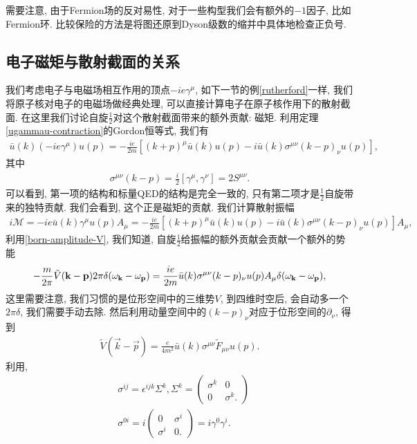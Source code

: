 需要注意, 由于Fermion场的反对易性, 对于一些构型我们会有额外的$-1$因子, 比如Fermion环. 比较保险的方法是将图还原到Dyson级数的缩并中具体地检查正负号.

\subsection{电子磁矩与散射截面的关系}
我们考虑电子与电磁场相互作用的顶点$-ie\gamma^\mu$, 如下一节的例\ref{rutherford}一样, 我们将原子核对电子的电磁场做经典处理, 可以直接计算电子在原子核作用下的散射截面. 在这里我们讨论自旋$\frac12$对这个散射截面带来的额外贡献: 磁矩. 利用定理\ref{ugammau-contraction}的Gordon恒等式, 我们有
\begin{align}
    \bar u(k)(-ie\gamma^\mu)u(p)=-\frac{ie}{2m}\left[(k+p)^\mu\bar u(k)u(p)-i\bar u(k)\sigma^{\mu\nu}(k-p)_\nu u(p)\right],
\end{align}
其中
\begin{align}
    \sigma^{\mu\nu}(k-p)=\frac i2[\gamma^\mu, \gamma^\nu]=2S^{\mu\nu}.
\end{align}
可以看到, 第一项的结构和标量QED的结构是完全一致的, 只有第二项才是$\frac12$自旋带来的独特贡献. 我们会看到, 这个正是磁矩的贡献. 我们计算散射振幅
\begin{align}
    i\mathcal M=-ie\bar u(k)\gamma^\mu u(p)A_\mu=-\frac{ie}{2m}\left[(k+p)^\mu\bar u(k)u(p)-i\bar u(k)\sigma^{\mu\nu}(k-p)_\nu u(p)\right]A_\mu,
\end{align}
利用\eqref{born-amplitude-V}, 我们知道, 自旋$\frac12$给振幅的额外贡献会贡献一个额外的势能
\begin{align}
    -\frac m{2\pi}\tilde V(\mathbf{k}-\mathbf{p})2\pi\delta(\omega_{\mathbf{k}}-\omega_{\mathbf{p}})=\frac{ie}{2m}\bar u(k)\sigma^{\mu\nu}(k-p)_\nu u(p)A_\mu\delta(\omega_{\mathbf{k}}-\omega_{\mathbf{p}})\label{ano-mu-cs},
\end{align}
这里需要注意, 我们习惯的是位形空间中的三维势$V$, 到四维时空后, 会自动多一个$2\pi\delta$, 我们需要手动去除. 然后利用动量空间中的$(k-p)_\nu$对应于位形空间的$\partial_\nu$, 得到
\begin{align}
    \tilde V(\vec k-\vec p)=\frac{e}{4m^2}\bar u(k)\sigma^{\mu\nu}\tilde F_{\mu\nu}u(p).
\end{align}
利用, 
\begin{align}
    & \sigma^{ij}=\epsilon^{ijk}\Sigma^k, \Sigma^k=\begin{pmatrix}
        \sigma^k & 0\\
        0 & \sigma^k.
    \end{pmatrix}\\
    & \sigma^{0i}=i\begin{pmatrix}
        0 & \sigma^i\\
        \sigma^i & 0.
    \end{pmatrix}=i\gamma^0\gamma^i.
\end{align}
